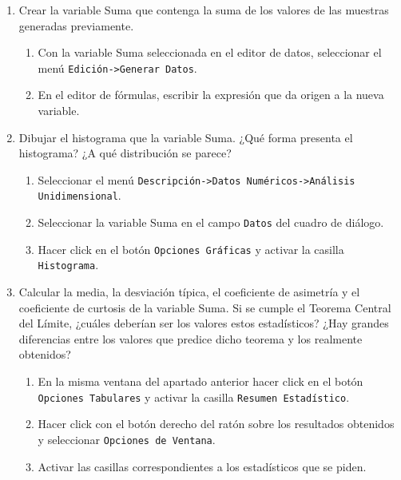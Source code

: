 \documentclass[a4paper]{article}
\begin{document}
\begin{enumerate}[leftmargin=*]
\begin {enumerate}
\item Crear la variable \textsf{Suma} que contenga la suma de los valores de las muestras generadas previamente.
\begin{indicacion}{
\begin{enumerate}
\item Con la variable \textsf{Suma} seleccionada en el editor de datos, seleccionar el menú \texttt{Edición->Generar Datos}.
\item En el editor de fórmulas, escribir la expresión que da origen a la nueva variable.
\end{enumerate}}
\end{indicacion}

\item Dibujar el histograma que la variable \textsf{Suma}. ¿Qué forma presenta el histograma? ¿A qué distribución se parece?
\begin{indicacion}{
\begin{enumerate}
\item Seleccionar el menú \texttt{Descripción->Datos Numéricos->Análisis Unidimensional}.
\item Seleccionar la variable \textsf{Suma} en el campo \texttt{Datos} del cuadro de diálogo.
\item Hacer click en el botón \texttt{Opciones Gráficas} y activar la casilla \texttt{Histograma}.
\end{enumerate}}
\end{indicacion}

\item Calcular la media, la desviación típica, el coeficiente de asimetría y el coeficiente de curtosis de la variable \textsf{Suma}. Si se cumple el Teorema
Central del Límite, ¿cuáles deberían ser los valores estos estadísticos? ¿Hay grandes diferencias entre los valores que predice dicho teorema y los realmente obtenidos?
\begin{indicacion}{
\begin{enumerate}
\item En la misma ventana del apartado anterior hacer click en el botón \texttt{Opciones Tabulares} y activar la casilla \texttt{Resumen Estadístico}.
\item Hacer click con el botón derecho del ratón sobre los resultados obtenidos y seleccionar \texttt{Opciones de Ventana}.
\item Activar las casillas correspondientes a los estadísticos que se piden.
\end{enumerate}}
\end{indicacion}


\end{enumerate}
\end{enumerate}
\end{document}
